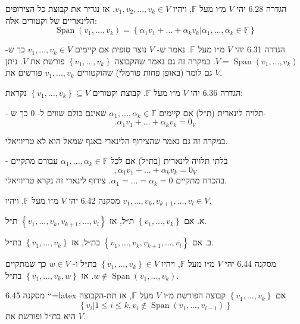 \documentclass[a4paper, 11pt]{article}
\newcommand{\Set}[1]{\left\{#1\right\}}
\begin{document}
\begin{envbox}[defcolor]{הגדרה 6.28}
יהי $V$ מ״ו מעל $\mathbb{F}$, ויהיו $v_1,v_2,...,v_k\in V$. אז נגדיר את קבוצת כל הצירופים הלינאריים של וקטורים אלה: 
\[
\mathop{\mathrm{Span}}(v_1,...,v_k)=\Set{\alpha_1v_1+...+\alpha_kv_k|\alpha_1,...,\alpha_k\in\mathbb{F}}
\]
\end{envbox}

\begin{envbox}[defcolor]{הגדרה 6.31}
יהי $V$ מ״ו מעל $\mathbb{F}$. נאמר ש- $V$ נוצר סופית אם קיימים $v_1,...,v_k\in V$ כך ש- $V=\mathop{\mathrm{Span}}(v_1,...,v_k)$. במקרה זה גם נאמר שהקבוצה $\Set{v_1,...,v_k}$ פורשת את $V$. ניתן גם לומר (באופן פחות פורמלי) שהוקטורים $v_1,...,v_k$ פורשים את $V$.
\end{envbox}

\begin{envbox}[defcolor]{הגדרה 6.36}
יהי $V$ מ״ו מעל $\mathbb{F}$. קבוצת וקטורים $\Set{v_1,...,v_k}\subseteq V$ נקראת:

-   תלויה לינארית (ת״ל) אם קיימים $\alpha_1,...,\alpha_k\in\mathbb{F}$ שאינם כולם שווים ל- $0$ כך ש- 
\[
.\alpha_1v_1+...+\alpha_kv_k=0_V
\]

    במקרה זה גם נאמר שהצירוף הלינארי באגף שמאל הוא לא טריוויאלי.

-   בלתי תלויה לינארית (בת״ל) אם לכל $\alpha_1,...,\alpha_k\in\mathbb{F}$ עבורם מתקיים 
\[
,\alpha_1v_1+...+\alpha_kv_k=0_V
\]
 בהכרח מתקיים $\alpha_1=...=\alpha_k=0$. צירוף לינארי זה נקרא טריוויאלי.
\end{envbox}

\begin{envbox}[thmcolor]{מסקנה 6.42}
יהי $V$ מ״ו מעל $\mathbb{F}$, ויהיו $v_1,...,v_k,v_{k+1},...,v_l\in V$.

א. אם $\Set{v_1,...,v_k}$ ת״ל, אז $\Set{v_1,...,v_k,v_{k+1},...,v_l}$ ת״ל.

ב. אם $\Set{v_1,...,v_k,v_{k+1},...,v_l}$ בת״ל, אז $\Set{v_1,...,v_k}$ בת״ל.
\end{envbox}

\begin{envbox}[thmcolor]{מסקנה 6.44}
יהי $V$ מ״ו מעל $\mathbb{F}$, ויהיו $\Set{v_1,...,v_k}\in V$ בת״ל ו- $w\in V$ כך שמתקיים $w\notin\mathop{\mathrm{Span}}(v_1,...,v_k)$. אז $\Set{v_1,...,v_k,w}$ בת״ל.
\end{envbox}

\begin{envbox}[thmcolor]{מסקנה 6.45}
`\label{cor:basis-extraction}`{=latex} אם $\Set{v_1,...,v_k}$ קבוצה הפורשת מ״ו $V$ מעל $\mathbb{F}$, אז תת-הקבוצה 
\[
\Set{v_i|1\leq i\leq k, v_i\notin\mathop{\mathrm{Span}}(v_1,...,v_{i-1})}
\]
 היא בת״ל ופורשת את $V$.
\end{envbox}
\end{document}
